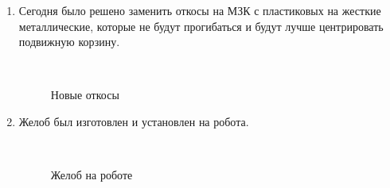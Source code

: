 \begin{enumerate}
\begin{enumerate}
		\item Сегодня было решено заменить откосы на МЗК с пластиковых на жесткие металлические, которые не будут прогибаться и будут лучше центрировать подвижную корзину.
		\begin{figure}[H]
			\begin{minipage}[h]{0.2\linewidth}
				\center  
			\end{minipage}
			\begin{minipage}[h]{0.6\linewidth}
				\caption{Новые откосы}
			\end{minipage}
		\end{figure}
		
		\item Желоб был изготовлен и установлен на робота.
		\begin{figure}[H]
			\begin{minipage}[h]{0.2\linewidth}
				\center  
			\end{minipage}
			\begin{minipage}[h]{0.6\linewidth}
				\caption{Желоб на роботе}
			\end{minipage}
		\end{figure}
		

\end{enumerate}
\end{enumerate}
